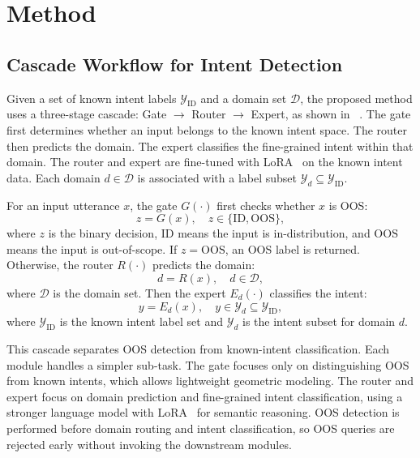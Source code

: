 \section{Method}
\subsection{Cascade Workflow for Intent Detection}
Given a set of known intent labels $\mathcal{Y}_{\mathrm{ID}}$ and a domain set $\mathcal{D}$, the proposed method uses a three-stage cascade: Gate $\rightarrow$ Router $\rightarrow$ Expert, as shown in ~. The gate first determines whether an input belongs to the known intent space. The router then predicts the domain. The expert classifies the fine-grained intent within that domain. The router and expert are fine-tuned with LoRA~\citep{hu2021lora} on the known intent data. Each domain $d \in \mathcal{D}$ is associated with a label subset $\mathcal{Y}_d \subseteq \mathcal{Y}_{\mathrm{ID}}$.

For an input utterance $x$, the gate $G(\cdot)$ first checks whether $x$ is OOS:
\begin{equation}
z = G(x), \quad z \in \{\mathrm{ID}, \mathrm{OOS}\},
\end{equation}
where $z$ is the binary decision, $\mathrm{ID}$ means the input is in-distribution, and $\mathrm{OOS}$ means the input is out-of-scope. If $z = \mathrm{OOS}$, an OOS label is returned. Otherwise, the router $R(\cdot)$ predicts the domain:
\begin{equation}
d = R(x), \quad d \in \mathcal{D},
\end{equation}
where $\mathcal{D}$ is the domain set. Then the expert $E_d(\cdot)$ classifies the intent:
\begin{equation}
y = E_d(x), \quad y \in \mathcal{Y}_d \subseteq \mathcal{Y}_{\mathrm{ID}},
\end{equation}
where $\mathcal{Y}_{\mathrm{ID}}$ is the known intent label set and $\mathcal{Y}_d$ is the intent subset for domain $d$.

This cascade separates OOS detection from known-intent classification. Each module handles a simpler sub-task. The gate focuses only on distinguishing OOS from known intents, which allows lightweight geometric modeling. The router and expert focus on domain prediction and fine-grained intent classification, using a stronger language model with LoRA~\citep{hu2021lora} for semantic reasoning. OOS detection is performed before domain routing and intent classification, so OOS queries are rejected early without invoking the downstream modules.


